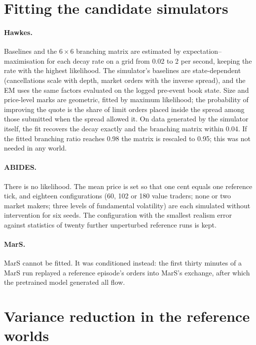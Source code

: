 \section{Fitting the candidate simulators}
\label{app:fits}

\paragraph{Hawkes.} Baselines and the $6\times6$ branching matrix are estimated by expectation--maximisation for each decay rate on a grid from 0.02 to 2 per second, keeping the rate with the highest likelihood. The simulator's baselines are state-dependent (cancellations scale with depth, market orders with the inverse spread), and the EM uses the same factors evaluated on the logged pre-event book state. Size and price-level marks are geometric, fitted by maximum likelihood; the probability of improving the quote is the share of limit orders placed inside the spread among those submitted when the spread allowed it. On data generated by the simulator itself, the fit recovers the decay exactly and the branching matrix within 0.04. If the fitted branching ratio reaches 0.98 the matrix is rescaled to 0.95; this was not needed in any world.

\paragraph{ABIDES.} There is no likelihood. The mean price is set so that one cent equals one reference tick, and eighteen configurations (60, 102 or 180 value traders; none or two market makers; three levels of fundamental volatility) are each simulated without intervention for six seeds. The configuration with the smallest realism error against statistics of twenty further unperturbed reference runs is kept.

\paragraph{MarS.} MarS cannot be fitted. It was conditioned instead: the first thirty minutes of a MarS run replayed a reference episode's orders into MarS's exchange, after which the pretrained model generated all flow.

\section{Variance reduction in the reference worlds}
\label{app:cv}

